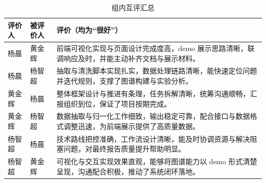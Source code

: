 \documentclass[lang=cn,a4paper,newtx,code=minted]{elegantpaper}
\begin{document}
\begin{table}[htbp]
    \centering
    \caption{组内互评汇总}
    \label{tab:peer_review}
    \begin{tabular}{p{} p{} p{}}
        \hline
        \textbf{评价人} & \textbf{被评价人} & \textbf{评价（均为“很好”）} \\
        \hline
        杨晨 & 黄金辉 & 前端可视化实现与页面设计完成度高，demo 展示思路清晰，联调响应及时，并能主动补齐文档与展示材料。 \\
        杨晨 & 杨智超 & 抽取与清洗脚本实现扎实，数据处理链路清晰，能快速定位问题并迭代规则，支撑了图谱构建与实验分析。 \\
        黄金辉 & 杨晨 & 整体框架设计与推进有条理，任务拆解清晰，统筹沟通顺畅，汇报组织到位，保证了项目按期完成。 \\
        黄金辉 & 杨智超 & 数据抽取与归一化工作细致，输出稳定可靠，配合接口与数据格式调整迅速，为前端展示提供了高质量数据。 \\
        杨智超 & 杨晨 & 技术路线把控准确，工作流设计清晰，能及时协调资源与解决阻塞问题，对最终报告质量提升帮助明显。 \\
        杨智超 & 黄金辉 & 可视化与交互实现效果直观，能够将图谱能力以 demo 形式清楚呈现，沟通配合积极，推动了系统闭环落地。 \\
        \hline
    \end{tabular}
\end{table}

\end{document}
